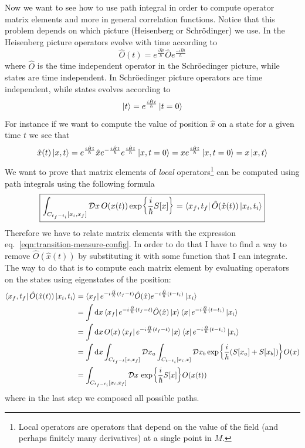 \documentclass[../main/main.tex]{subfiles}
\begin{document}
Now we want to see how to use path integral in order to compute operator matrix elements and more in general correlation functions. Notice that this problem depends on which picture (Heisenberg or Schrödinger) we use. In the Heisenberg picture operators evolve with time according to
\[\hat O(t)=e^{\frac{i\hat Ht}{\hbar}}\hat Oe^{\frac{-i\hat Ht}{\hbar}}\]
where $\hat O$ is the time independent operator in the Schröedinger picture, while states are time independent. In Schröedinger picture operators are time independent, while states evolves according to
\[\ket t=e^{\frac{i\hat Ht}{\hbar}}\ket{t=0}\]
For instance if we want to compute the value of position $\hat x$ on a state for a given time $t$ we see that
\[\hat x(t)\ket{x,t}=e^{\frac{i\hat Ht}{\hbar}}\hat xe^{-\frac{i\hat Ht}{\hbar}}e^{\frac{i\hat Ht}{\hbar}}\ket{x, t=0}=xe^{\frac{i\hat Ht}{\hbar}}\ket{x, t=0}=x\ket{x,t}\]
We want to prove that matrix elements of \emph{local} operators\footnote{Local operators are operators that depend on the value of the field (and perhaps finitely many derivatives) at a single point in $M$.} can be computed using path integrals using the following formula
\begin{equation}\boxed{
\int_{C_{t_f-t_i}[x_i,x_f]}\mathcal Dx\,O(x(t))\exp{\frac i\hbar S[x]}=\bra{x_f,t_f}\hat O(\hat x(t))\ket{x_i,t_i}
}\end{equation}
Therefore we have to relate matrix elements with the expression eq.~\eqref{eqn:transition-measure-config}. In order to do that I have to find a way to remove $\hat O(\hat x(t))$ by substituting it with some function that I can integrate. The way to do that is to compute each matrix element by evaluating operators on the states using eigenstates of the position:
\begin{equation}\label{eqn:matrix-element-to-path-integral}\begin{split}
\bra{x_f,t_f}\hat O(\hat x(t))\ket{x_i,t_i}
&=\bra{x_f}e^{-i\frac{\hat H}{\hbar}(t_f-t)}\hat O(\hat x)e^{-i\frac{\hat H}{\hbar}(t-t_i)}\ket{x_i}\\
&=\int\textup{d} x\bra{x_f}e^{-i\frac{\hat H}{\hbar}(t_f-t)}\hat O(\hat x)\ket x\bra xe^{-i\frac{\hat H}{\hbar}(t-t_i)}\ket{x_i}\\
&=\int\textup{d} x\,O(x)\bra{x_f}e^{-i\frac{\hat H}{\hbar}(t_f-t)}\ket x\bra xe^{-i\frac{\hat H}{\hbar}(t-t_i)}\ket{x_i}\\
&=\int\textup{d} x\int_{C_{t_f-t}[x,x_f]}\mathcal Dx_a\int_{C_{t-t_i}[x_i,x]}\mathcal Dx_b\exp{\frac i\hbar(S[x_a]+S[x_b])}O(x)\\
&=\int_{C_{t_f-t_i}[x_i,x_f]}\mathcal Dx\,\exp{\frac i\hbar S[x]}O(x(t))
\end{split}\end{equation}
where in the last step we composed all possible paths.
\end{document}
